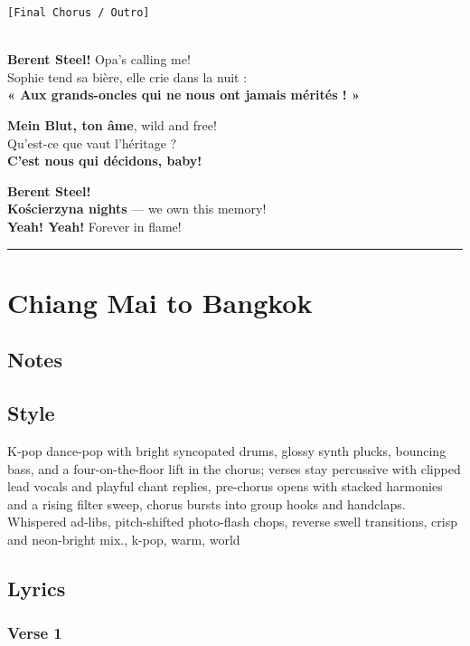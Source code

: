 \documentclass[]{article}
\begin{document}
\texttt{{[}Final\ Chorus\ /\ Outro{]}}\strut \\
\textbf{Berent Steel!} Opa's calling me!\\
Sophie tend sa bière, elle crie dans la nuit :\\
\textbf{« Aux grands-oncles qui ne nous ont jamais mérités ! »}

\textbf{Mein Blut, ton âme}, wild and free!\\
Qu'est-ce que vaut l'héritage ?\\
\textbf{C'est nous qui décidons, baby!}

\textbf{Berent Steel!}\\
\textbf{Kościerzyna nights} --- we own this memory!\\
\textbf{Yeah! Yeah!} Forever in flame!

\begin{center}\rule{0.5\linewidth}{0.5pt}\end{center}

\section{Chiang Mai to Bangkok}\label{chiang-mai-to-bangkok}

\subsection{Notes}\label{notes-49}

\subsection{Style}\label{style-49}

K-pop dance-pop with bright syncopated drums, glossy synth plucks,
bouncing bass, and a four-on-the-floor lift in the chorus; verses stay
percussive with clipped lead vocals and playful chant replies,
pre-chorus opens with stacked harmonies and a rising filter sweep,
chorus bursts into group hooks and handclaps. Whispered ad-libs,
pitch-shifted photo-flash chops, reverse swell transitions, crisp and
neon-bright mix., k-pop, warm, world

\subsection{Lyrics}\label{lyrics-49}

\subsubsection{Verse 1}\label{verse-1-31}
\end{document}
